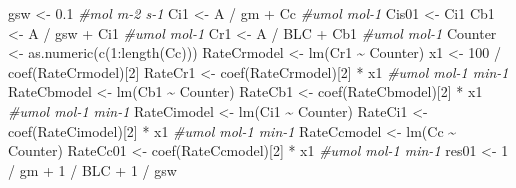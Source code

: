 \documentclass[
]{krantz}
\makeatletter
\newenvironment{Shaded}{\begin{snugshade}}{\end{snugshade}}
\newcommand{\CommentTok}[1]{\textcolor[rgb]{0.56,0.35,0.01}{\textit{#1}}}
\newcommand{\DecValTok}[1]{\textcolor[rgb]{0.00,0.00,0.81}{#1}}
\newcommand{\FloatTok}[1]{\textcolor[rgb]{0.00,0.00,0.81}{#1}}
\newcommand{\FunctionTok}[1]{\textcolor[rgb]{0.00,0.00,0.00}{#1}}
\newcommand{\NormalTok}[1]{#1}
\newcommand{\OtherTok}[1]{\textcolor[rgb]{0.56,0.35,0.01}{#1}}
\newcommand{\SpecialCharTok}[1]{\textcolor[rgb]{0.00,0.00,0.00}{#1}}
\newenvironment{kframe}{%
\medskip{}
\setlength{\fboxsep}{.8em}
 \def\at@end@of@kframe{}%
 \ifinner\ifhmode%
  \def\at@end@of@kframe{\end{minipage}}%
  \begin{minipage}{\columnwidth}%
 \fi\fi%
 \def\FrameCommand##1{\hskip\@totalleftmargin \hskip-\fboxsep
 \colorbox{shadecolor}{##1}\hskip-\fboxsep
     \hskip-\linewidth \hskip-\@totalleftmargin \hskip\columnwidth}%
 \MakeFramed {\advance\hsize-\width
   \@totalleftmargin\z@ \linewidth\hsize
   \@setminipage}}%
 {\par\unskip\endMakeFramed%
 \at@end@of@kframe}
\renewenvironment{Shaded}{\begin{kframe}}{\end{kframe}}
\makeatother
\begin{document}
\begin{Shaded}
\begin{Highlighting}[]
\NormalTok{gsw }\OtherTok{\textless{}{-}} \FloatTok{0.1} \CommentTok{\#mol m{-}2 s{-}1}
\NormalTok{Ci1 }\OtherTok{\textless{}{-}}\NormalTok{ A }\SpecialCharTok{/}\NormalTok{ gm }\SpecialCharTok{+}\NormalTok{ Cc }\CommentTok{\#umol mol{-}1}
\NormalTok{Cis01 }\OtherTok{\textless{}{-}}\NormalTok{ Ci1}
\NormalTok{Cb1 }\OtherTok{\textless{}{-}}\NormalTok{ A }\SpecialCharTok{/}\NormalTok{ gsw }\SpecialCharTok{+}\NormalTok{ Ci1 }\CommentTok{\#umol mol{-}1}
\NormalTok{Cr1 }\OtherTok{\textless{}{-}}\NormalTok{ A }\SpecialCharTok{/}\NormalTok{ BLC }\SpecialCharTok{+}\NormalTok{ Cb1 }\CommentTok{\#umol mol{-}1}
\NormalTok{Counter }\OtherTok{\textless{}{-}} \FunctionTok{as.numeric}\NormalTok{(}\FunctionTok{c}\NormalTok{(}\DecValTok{1}\SpecialCharTok{:}\FunctionTok{length}\NormalTok{(Cc)))}
\NormalTok{RateCrmodel }\OtherTok{\textless{}{-}} \FunctionTok{lm}\NormalTok{(Cr1 }\SpecialCharTok{\textasciitilde{}}\NormalTok{ Counter)}
\NormalTok{x1 }\OtherTok{\textless{}{-}} \DecValTok{100} \SpecialCharTok{/} \FunctionTok{coef}\NormalTok{(RateCrmodel)[}\DecValTok{2}\NormalTok{]}
\NormalTok{RateCr1 }\OtherTok{\textless{}{-}} \FunctionTok{coef}\NormalTok{(RateCrmodel)[}\DecValTok{2}\NormalTok{] }\SpecialCharTok{*}\NormalTok{ x1 }\CommentTok{\#umol mol{-}1 min{-}1}
\NormalTok{RateCbmodel }\OtherTok{\textless{}{-}} \FunctionTok{lm}\NormalTok{(Cb1 }\SpecialCharTok{\textasciitilde{}}\NormalTok{ Counter)}
\NormalTok{RateCb1 }\OtherTok{\textless{}{-}} \FunctionTok{coef}\NormalTok{(RateCbmodel)[}\DecValTok{2}\NormalTok{] }\SpecialCharTok{*}\NormalTok{ x1 }\CommentTok{\#umol mol{-}1 min{-}1}
\NormalTok{RateCimodel }\OtherTok{\textless{}{-}} \FunctionTok{lm}\NormalTok{(Ci1 }\SpecialCharTok{\textasciitilde{}}\NormalTok{ Counter)}
\NormalTok{RateCi1 }\OtherTok{\textless{}{-}} \FunctionTok{coef}\NormalTok{(RateCimodel)[}\DecValTok{2}\NormalTok{] }\SpecialCharTok{*}\NormalTok{ x1 }\CommentTok{\#umol mol{-}1 min{-}1}
\NormalTok{RateCcmodel }\OtherTok{\textless{}{-}} \FunctionTok{lm}\NormalTok{(Cc }\SpecialCharTok{\textasciitilde{}}\NormalTok{ Counter)}
\NormalTok{RateCc01 }\OtherTok{\textless{}{-}} \FunctionTok{coef}\NormalTok{(RateCcmodel)[}\DecValTok{2}\NormalTok{] }\SpecialCharTok{*}\NormalTok{ x1 }\CommentTok{\#umol mol{-}1 min{-}1}
\NormalTok{res01 }\OtherTok{\textless{}{-}} \DecValTok{1} \SpecialCharTok{/}\NormalTok{ gm }\SpecialCharTok{+} \DecValTok{1} \SpecialCharTok{/}\NormalTok{ BLC }\SpecialCharTok{+} \DecValTok{1} \SpecialCharTok{/}\NormalTok{ gsw}


\end{Highlighting}
\end{Shaded}
\end{document}
